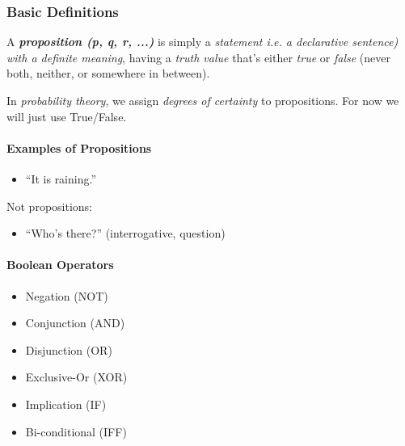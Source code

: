 \documentclass[english, 11pt]{article}
\begin{document}
\begin{addmargin}[2em]{2em}
  \subsubsection{Basic Definitions}
    \begin{addmargin}[1em]{2em} %
        \begin{mdframed}
        	\begin{defn}[Proposition]\label{Propositional}
        		A \textbf{\textit{proposition (p, q, r, ...)}} is simply a \textit{statement i.e. a declarative sentence) with a definite meaning}, having
        		a \textit{truth value} that's either \textit{true} or \textit{false} (never both, neither, or somewhere in between).
          \end{defn}
        \end{mdframed}

        \medskip

        In \textit{probability theory}, we assign \textit{degrees of certainty} to propositions. For now we will
        just use True/False.

        \paragraph{Examples of Propositions}
          \begin{itemize}
            \item ``It is raining.''
          \end{itemize}
          \medskip
          Not propositions:
          \begin{itemize}
            \item ``Who's there?'' (interrogative, question)
          \end{itemize}

          \paragraph{Boolean Operators}
          \begin{itemize}
            \item Negation (NOT)
            \item Conjunction (AND)
            \item Disjunction (OR)
            \item Exclusive-Or (XOR)
            \item Implication (IF)
            \item Bi-conditional (IFF)
          \end{itemize}


\end{addmargin}
\end{addmargin}
\end{document}
